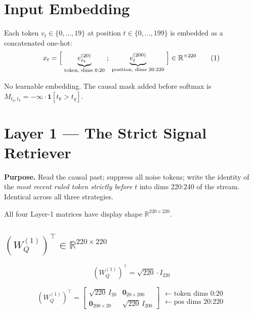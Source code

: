 \documentclass[11pt]{article}
\newcommand{\R}{\mathbb{R}}
\begin{document}
\section{Input Embedding}

Each token $v_t\in\{0,\ldots,19\}$ at position $t\in\{0,\ldots,199\}$ is embedded as a concatenated one-hot:
\[
x_t = \Bigl[\;\underbrace{e_{v_t}^{(20)}}_{\text{token, dims }0\text{:}20}\;;\;
             \underbrace{e_t^{(200)}}_{\text{position, dims }20\text{:}220}\;\Bigr]
\in\R^{\times 220}
\tag{1}
\]

No learnable embedding. The causal mask added before softmax is
$M_{t_q,t_k}=-\infty\cdot\mathbf{1}[t_k>t_q]$.

\section{Layer 1 --- The Strict Signal Retriever}

\textbf{Purpose.} Read the causal past; suppress all noise tokens; write the identity of the
\emph{most recent ruled token strictly before} $t$ into dims 220:240 of the stream.
Identical across all three strategies.

All four Layer-1 matrices have display shape $\R^{220\times 220}$.

\subsection{$(W_Q^{(1)})^\top\in\R^{220\times 220}$}

\begin{equation}
\boxed{(W_Q^{(1)})^\top = \sqrt{220}\cdot I_{220}}
\tag{2}
\end{equation}

\[
(W_Q^{(1)})^\top =
\begin{bmatrix}\sqrt{220}\,I_{20} & \mathbf{0}_{20\times200}\\
               \mathbf{0}_{200\times20} & \sqrt{220}\,I_{200}\end{bmatrix}
\begin{array}{l}\leftarrow\text{token dims }0\text{:}20\\\leftarrow\text{pos dims }20\text{:}220\end{array}
\]
\end{document}
